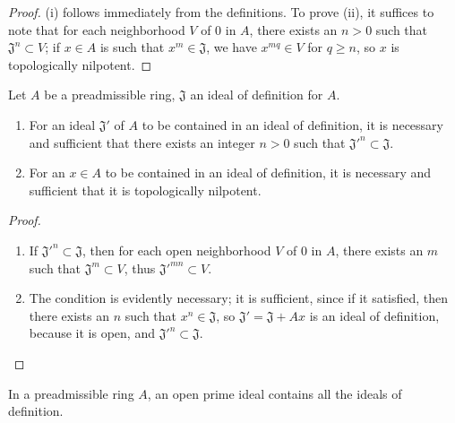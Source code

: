 \begin{proof}
\label{proof-0.7.1.3}
(i) follows immediately from the definitions. To prove (ii), it suffices to note that for
each neighborhood $V$ of $0$ in $A$, there exists an $n>0$ such that
$\mathfrak{J}^n\subset V$; if $x\in A$ is such that $x^m\in\mathfrak{J}$, we have
$x^{mq}\in V$ for $q\geq n$, so $x$ is topologically nilpotent.
\end{proof}

\begin{proposition}[7.1.4]
\label{0.7.1.4}
Let $A$ be a preadmissible ring, $\mathfrak{J}$ an ideal of definition for $A$.
\begin{enumerate}[label=\emph{(\roman*)}]
  \item For an ideal $\mathfrak{J}'$ of $A$ to be contained in an ideal of
    definition, it is necessary and sufficient that there exists an integer
    $n>0$ such that ${\mathfrak{J}'}^n\subset\mathfrak{J}$.
  \item For an $x\in A$ to be contained in an ideal of definition, it is
    necessary and sufficient that it is topologically nilpotent.
\end{enumerate}
\end{proposition}

\begin{proof}
\label{proof-0.7.1.4}
\medskip\noindent
\begin{enumerate}[label=(\roman*)]
  \item If ${\mathfrak{J}'}^n\subset\mathfrak{J}$, then for each open neighborhood
    $V$ of $0$ in $A$, there exists an $m$ such that $\mathfrak{J}^m\subset V$, thus
    ${\mathfrak{J}'}^{mn}\subset V$.
  \item The condition is evidently necessary; it is sufficient, since if it
    satisfied, then there exists an $n$ such that $x^n\in\mathfrak{J}$, so
    $\mathfrak{J}'=\mathfrak{J}+Ax$ is an ideal of definition, because it is
    open, and ${\mathfrak{J}'}^n\subset\mathfrak{J}$.
\end{enumerate}
\end{proof}

\begin{corollary}[7.1.5]
\label{0.7.1.5}
In a preadmissible ring $A$, an open prime ideal contains all the ideals of definition.
\end{corollary}

